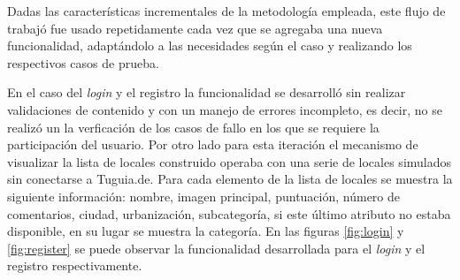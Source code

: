 Dadas las características incrementales de la metodología empleada, este flujo de trabajó fue usado repetidamente cada vez que se agregaba una nueva funcionalidad, adaptándolo a las necesidades según el caso y realizando los respectivos casos de prueba.

En el caso del \textit{login} y el registro la funcionalidad se desarrolló sin realizar validaciones de contenido y con un manejo de errores incompleto, es decir, no se realizó un la verficación de los casos de fallo en los que se requiere la participación del usuario. Por otro lado para esta iteración el mecanismo de visualizar la lista de locales construido operaba con una serie de locales simulados sin conectarse a Tuguia.de. Para cada elemento de la lista de locales se muestra la siguiente información: nombre, imagen principal, puntuación, número de comentarios, ciudad, urbanización, subcategoría, si este último atributo no estaba disponible, en su lugar se muestra la categoría. En las figuras \ref{fig:login} y \ref{fig:register} se puede observar la funcionalidad desarrollada para el \textit{login} y el registro respectivamente.
\\
\\
